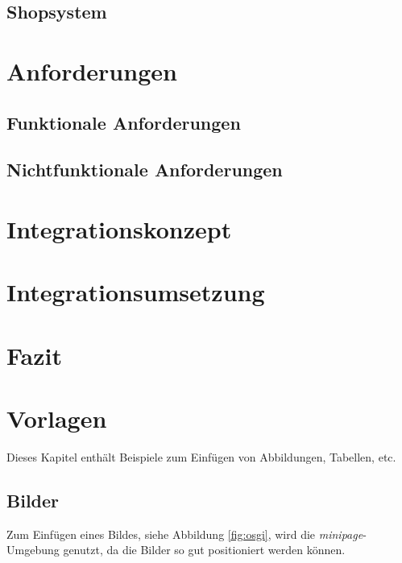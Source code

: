 \documentclass[12pt,a4paper,bibliography=totocnumbered,listof=totoc]{scrartcl}
\begin{document}
\subsection{Shopsystem}

\pagebreak

\section{Anforderungen}

\subsection{Funktionale Anforderungen}

\subsection{Nichtfunktionale Anforderungen}

\pagebreak

\section{Integrationskonzept}

\pagebreak

\section{Integrationsumsetzung}

\pagebreak

\section{Fazit}

\pagebreak

\section{Vorlagen}
Dieses Kapitel enthält Beispiele zum Einfügen von Abbildungen, Tabellen, etc.

\subsection{Bilder}
Zum Einfügen eines Bildes, siehe Abbildung \ref{fig:osgi}, wird die \textit{minipage}-Umgebung genutzt, da die Bilder so gut positioniert werden können.
\end{document}
